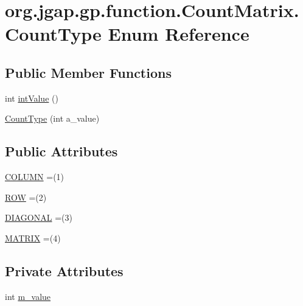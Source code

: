 \hypertarget{enumorg_1_1jgap_1_1gp_1_1function_1_1_count_matrix_1_1_count_type}{\section{org.\-jgap.\-gp.\-function.\-Count\-Matrix.\-Count\-Type Enum Reference}
\label{enumorg_1_1jgap_1_1gp_1_1function_1_1_count_matrix_1_1_count_type}
}
\subsection*{Public Member Functions}
\begin{DoxyCompactItemize}
\item 
int \hyperlink{enumorg_1_1jgap_1_1gp_1_1function_1_1_count_matrix_1_1_count_type_a9a7fba283f75d4aca2024c72f04521e9}{int\-Value} ()
\item 
\hyperlink{enumorg_1_1jgap_1_1gp_1_1function_1_1_count_matrix_1_1_count_type_af5558dc55ef0744f3e3836335b792b6a}{Count\-Type} (int a\-\_\-value)
\end{DoxyCompactItemize}
\subsection*{Public Attributes}
\begin{DoxyCompactItemize}
\item 
\hyperlink{enumorg_1_1jgap_1_1gp_1_1function_1_1_count_matrix_1_1_count_type_a7ab04ee65255adb71c8f6a47b727b775}{C\-O\-L\-U\-M\-N} =(1)
\item 
\hyperlink{enumorg_1_1jgap_1_1gp_1_1function_1_1_count_matrix_1_1_count_type_a45fcb697f06e665534259c110f2c32ec}{R\-O\-W} =(2)
\item 
\hyperlink{enumorg_1_1jgap_1_1gp_1_1function_1_1_count_matrix_1_1_count_type_a2d241774e0b56e6c7a7be79cecc7d1ba}{D\-I\-A\-G\-O\-N\-A\-L} =(3)
\item 
\hyperlink{enumorg_1_1jgap_1_1gp_1_1function_1_1_count_matrix_1_1_count_type_ab0c9b4428d0cad392e0f1216b757c0ac}{M\-A\-T\-R\-I\-X} =(4)
\end{DoxyCompactItemize}
\subsection*{Private Attributes}
\begin{DoxyCompactItemize}
\item 
int \hyperlink{enumorg_1_1jgap_1_1gp_1_1function_1_1_count_matrix_1_1_count_type_a64b4c38ac118af50023dbeee1ae8c562}{m\-\_\-value}
\end{DoxyCompactItemize}


